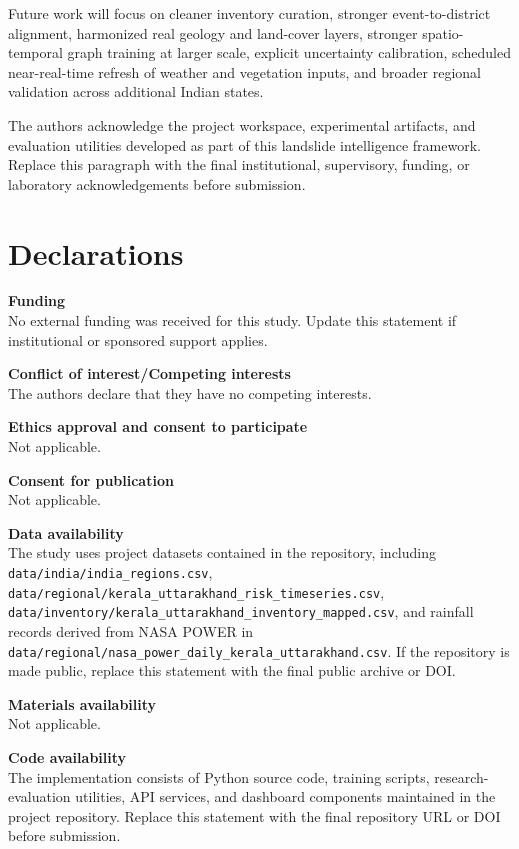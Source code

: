 \documentclass[pdflatex,sn-mathphys-num]{sn-jnl}
\begin{document}
Future work will focus on cleaner inventory curation, stronger event-to-district alignment, harmonized real geology and land-cover layers, stronger spatio-temporal graph training at larger scale, explicit uncertainty calibration, scheduled near-real-time refresh of weather and vegetation inputs, and broader regional validation across additional Indian states.

\backmatter


The authors acknowledge the project workspace, experimental artifacts, and evaluation utilities developed as part of this landslide intelligence framework. Replace this paragraph with the final institutional, supervisory, funding, or laboratory acknowledgements before submission.

\section*{Declarations}

\textbf{Funding}\\
No external funding was received for this study. Update this statement if institutional or sponsored support applies.

\textbf{Conflict of interest/Competing interests}\\
The authors declare that they have no competing interests.

\textbf{Ethics approval and consent to participate}\\
Not applicable.

\textbf{Consent for publication}\\
Not applicable.

\textbf{Data availability}\\
The study uses project datasets contained in the repository, including \texttt{data/india/india\_regions.csv}, \texttt{data/regional/kerala\_uttarakhand\_risk\_timeseries.csv}, \texttt{data/inventory/kerala\_uttarakhand\_inventory\_mapped.csv}, and rainfall records derived from NASA POWER in \texttt{data/regional/nasa\_power\_daily\_kerala\_uttarakhand.csv}. If the repository is made public, replace this statement with the final public archive or DOI.

\textbf{Materials availability}\\
Not applicable.

\textbf{Code availability}\\
The implementation consists of Python source code, training scripts, research-evaluation utilities, API services, and dashboard components maintained in the project repository. Replace this statement with the final repository URL or DOI before submission.
\end{document}
